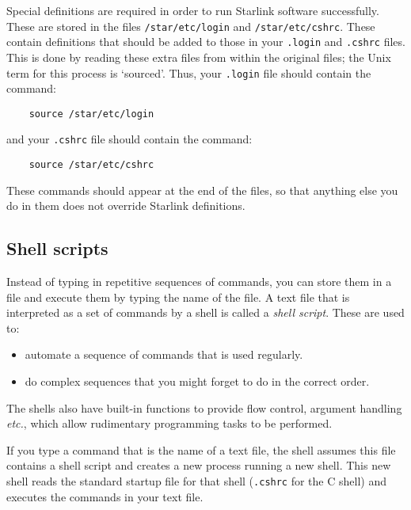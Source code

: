 Special definitions are required in order to run Starlink software successfully.
These are stored in the files {\tt /star/etc/login} and {\tt /star/etc/cshrc}.
These contain definitions that should be added to those in your {\tt .login} and
{\tt .cshrc} files.
This is done by reading these extra files from within the original files; the
Unix term for this process is `sourced'.
Thus, your {\tt .login} file should contain the command:
\begin{verbatim}
    source /star/etc/login
\end{verbatim}
and your {\tt .cshrc} file should contain the command:
\begin{verbatim}
    source /star/etc/cshrc
\end{verbatim}
These commands should appear at the end of the files, so that anything else
you do in them does not override Starlink definitions.

\subsection{Shell scripts\label{ss2}}

Instead of typing in repetitive sequences of commands, you can store them
in a file and execute them by typing the name of the file.
A text file that is interpreted as a set of commands by a shell is called a
{\em shell script}.
These are used to:
\begin{itemize}
\item automate a sequence of commands that is used regularly.
\item do complex sequences that you might forget to do in the correct order.
\end{itemize}
The shells also have built-in functions to provide flow control, argument
handling {\em etc.}, which allow rudimentary programming tasks to be performed.

If you type a command that is the name of a text file, the shell assumes this
file contains a shell script and creates a new process running a new shell.
This new shell reads the standard startup file for that shell ({\tt .cshrc}
for the C shell) and executes the commands in your text file.

